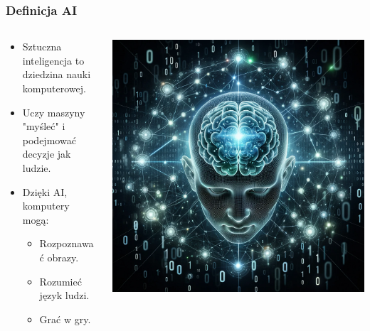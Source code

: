 \documentclass[smaller]{beamer}
\begin{document}
\begin{frame}
\frametitle{Definicja AI}

\begin{columns}
    \begin{column}{0.6\textwidth}
        \begin{itemize}
            \item Sztuczna inteligencja to dziedzina nauki komputerowej.
            \item Uczy maszyny "myśleć" i podejmować decyzje jak ludzie.
            \item Dzięki AI, komputery mogą:
            \begin{itemize}
                \item Rozpoznawać obrazy.
                \item Rozumieć język ludzi.
                \item Grać w gry.
            \end{itemize}
        \end{itemize}
    \end{column}

    \begin{column}{0.4\textwidth}
        \includegraphics[width=\textwidth]{../manifest/definicja-ai.png}
    \end{column}
\end{columns}
\end{frame}
\end{document}
